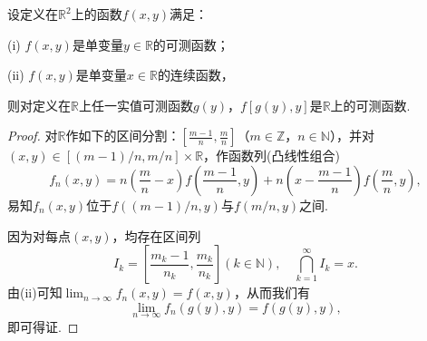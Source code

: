 \documentclass[../../main.tex]{subfiles}%
\begin{document}
\begin{theorem}
设定义在\(\mathbb{R}^{2}\)上的函数\(f(x, y)\)满足：

(i) \(f(x, y)\)是单变量\(y \in \mathbb{R}\)的可测函数；

(ii) \(f(x, y)\)是单变量\(x \in \mathbb{R}\)的连续函数，

则对定义在\(\mathbb{R}\)上任一实值可测函数\(g(y)\)，\(f[g(y), y]\)是\(\mathbb{R}\)上的可测函数.
\end{theorem}
\begin{proof}

对\(\mathbb{R}\)作如下的区间分割：\(\left[\frac{m - 1}{n}, \frac{m}{n}\right]\)（\(m \in \mathbb{Z}\)，\(n \in \mathbb{N}\)），并对\((x, y) \in [(m - 1) / n, m / n] \times \mathbb{R}\)，作函数列(凸线性组合)
\[
f_{n}(x, y) = n\left(\frac{m}{n} - x\right)f\left(\frac{m - 1}{n}, y\right) + n\left(x - \frac{m - 1}{n}\right)f\left(\frac{m}{n}, y\right),
\]
易知\(f_{n}(x, y)\)位于\(f((m - 1) / n, y)\)与\(f(m / n, y)\)之间.

因为对每点\((x, y)\)，均存在区间列
\[
I_{k} = \left[\frac{m_{k} - 1}{n_{k}}, \frac{m_{k}}{n_{k}}\right] (k \in \mathbb{N}), \quad \bigcap_{k = 1}^{\infty} I_{k} = x.
\]
由(ii)可知\(\lim_{n \to \infty} f_{n}(x, y) = f(x, y)\)，从而我们有
\[
\lim_{n \to \infty} f_{n}(g(y), y) = f(g(y), y),
\]
即可得证. 

\end{proof}
\end{document}
